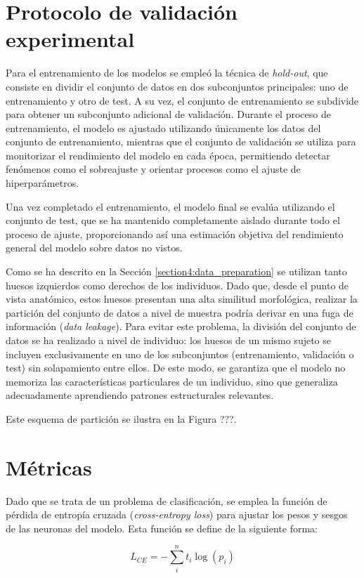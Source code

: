 \section{Protocolo de validación experimental}
Para el entrenamiento de los modelos se empleó la técnica de \textit{hold-out}, que consiste en dividir el conjunto de datos en dos subconjuntos principales: uno de entrenamiento y otro de test. A su vez, el conjunto de entrenamiento se subdivide para obtener un subconjunto adicional de validación. Durante el proceso de entrenamiento, el modelo es ajustado utilizando únicamente los datos del conjunto de entrenamiento, mientras que el conjunto de validación se utiliza para monitorizar el rendimiento del modelo en cada época, permitiendo detectar fenómenos como el sobreajuste y orientar procesos como el ajuste de hiperparámetros.

Una vez completado el entrenamiento, el modelo final se evalúa utilizando el conjunto de test, que se ha mantenido completamente aislado durante todo el proceso de ajuste, proporcionando así una estimación objetiva del rendimiento general del modelo sobre datos no vistos.

Como se ha descrito en la Sección \ref{section4:data_preparation} se utilizan tanto huesos izquierdos como derechos de los individuos. Dado que, desde el punto de vista anatómico, estos huesos presentan una alta similitud morfológica, realizar la partición del conjunto de datos a nivel de muestra podría derivar en una fuga de información (\textit{data leakage}). Para evitar este problema, la división del conjunto de datos se ha realizado a nivel de individuo: los huesos de un mismo sujeto se incluyen exclusivamente en uno de los subconjuntos (entrenamiento, validación o test) sin solapamiento entre ellos. De este modo, se garantiza que el modelo no memoriza las características particulares de un individuo, sino que generaliza adecuadamente aprendiendo patrones estructurales relevantes.

Este esquema de partición se ilustra en la Figura ???.
\section{Métricas}
\label{section5:metrics}
Dado que se trata de un problema de clasificación, se emplea la función de pérdida de entropía cruzada (\textit{cross-entropy loss}) para ajustar los pesos y sesgos de las neuronas del modelo. Esta función se define de la siguiente forma:

\begin{equation}
L_{CE} = -\sum_i^n t_i \log(p_i)
\end{equation}

